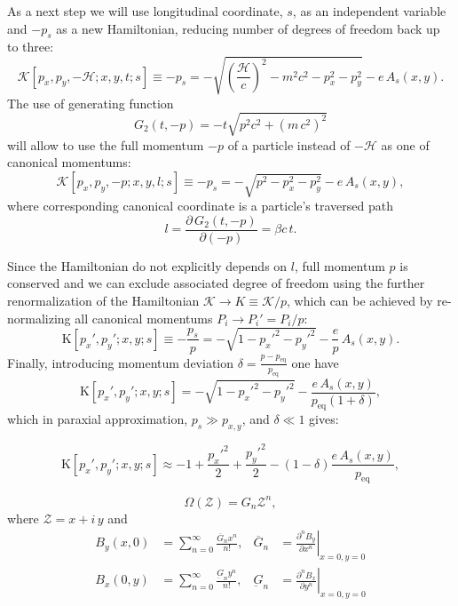 \documentclass[]{article}
\begin{document}
As a next step we will use longitudinal coordinate, $s$, as an independent
variable and $-p_s$ as a new Hamiltonian, reducing number of degrees of freedom
back up to three:
\[
	\mathcal{K}[p_x,p_y,-\mathcal{H};x,y,t;s] \equiv -p_s =
	- \sqrt{ \left(\frac{\mathcal{H}}{c}\right)^2 - m^2c^2 - p_x^2 - p_y^2}
	- e\,A_s(x,y).
\]
The use of generating function
\[
	G_2(t,-p) = - t \sqrt{p^2c^2+(m\,c^2)^2}
\]
will allow to use the full momentum $-p$ of a particle instead of $-\mathcal{H}$
as one of canonical momentums:
\[
	\mathcal{K}[p_x,p_y,-p;x,y,l;s] \equiv -p_s =
	- \sqrt{ p^2 - p_x^2 - p_y^2}
	- e\,A_s(x,y),
\]
where corresponding canonical coordinate is a particle's traversed path
\[
	l = \frac{\partial\,G_2(t,-p)}{\partial(-p)} = \beta c\,t.
\]

Since the Hamiltonian do not explicitly depends on $l$, full momentum $p$ is
conserved and we can exclude associated degree of freedom using the further
renormalization of the Hamiltonian $\mathcal{K} \rightarrow K \equiv \mathcal{K}/p$,
which can be achieved by re-normalizing all canonical momentums
$P_i \rightarrow P_i' = P_i/p$:
\[
	\mathrm{K}[p_x',p_y';x,y;s] \equiv - \frac{p_s}{p} =
	- \sqrt{
			1 - p_x'^2 - p_y'^2
	} - \frac{e}{p}\,A_s(x,y).
\]
Finally, introducing momentum deviation
$\delta = \frac{p - p_{\text{eq}}}{p_{\text{eq}}}$ one have
\[
	\mathrm{K}[p_x',p_y';x,y;s] =
	- \sqrt{
			1 - p_x'^2 - p_y'^2
	} - \frac{e\,A_s(x,y)}{p_{\text{eq}}(1+\delta)},
\]
which in paraxial approximation, $p_s \gg p_{x,y}$, and $\delta \ll 1$ gives:

\[
	\mathrm{K}[p_x',p_y';x,y;s] \approx
	-  1 + \frac{p_x'^2}{2} + \frac{p_y'^2}{2}
	- (1-\delta)\frac{e\,A_s(x,y)}{p_{\text{eq}}},
\]


\[
\Omega(\mathcal{Z}) = G_n\mathcal{Z}^n,
\]
where $\mathcal{Z} = x + i\,y$ and 
\begin{align*}
	B_y (x,0)		&= \sum_{n=0}^{\infty} \frac{\overline G_n x^n}{n!},	&
	\overline G_n	&=	\left.
						\frac{\partial^n B_y}{\partial x^n}
						\right|_{x=0,y=0}									\\
	B_x (0,y)		&= \sum_{n=0}^{\infty} \frac{\underbar G_n y^n}{n!},	&
	\underbar G_n	&=	\left.
						\frac{\partial^n B_x}{\partial y^n}
						\right|_{x=0,y=0}
\end{align*}

\newpage
\end{document}
